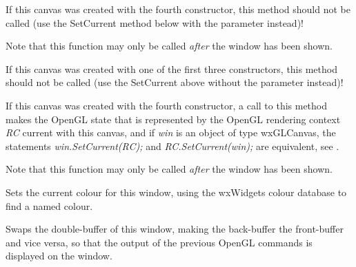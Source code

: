 If this canvas was created with the fourth constructor, this method should not be called
(use the SetCurrent method below with the parameter instead)!

Note that this function may only be called \emph{after} the window has been shown.


\label{wxglcanvassetcurrentrc}


If this canvas was created with one of the first three constructors,
this method should not be called (use the SetCurrent above without the parameter instead)!

If this canvas was created with the fourth constructor, a call to this method
makes the OpenGL state that is represented by the OpenGL rendering context { \it RC } current with this canvas,
and if { \it win } is an object of type wxGLCanvas, the statements { \it win.SetCurrent(RC); } and { \it RC.SetCurrent(win); } are equivalent,
see .

Note that this function may only be called \emph{after} the window has been shown.


\label{wxglcanvassetcolour}


Sets the current colour for this window, using the wxWidgets colour database to find a named colour.


\label{wxglcanvasswapbuffers}


Swaps the double-buffer of this window, making the back-buffer the front-buffer and vice versa,
so that the output of the previous OpenGL commands is displayed on the window.
